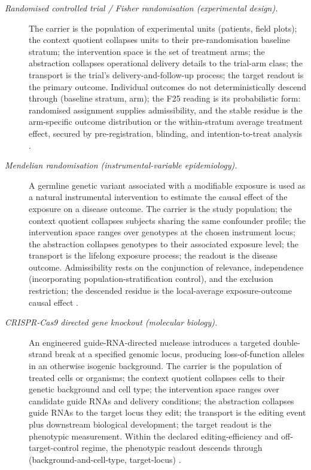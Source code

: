 \documentclass[11pt]{article}
\theoremstyle{definition}
\begin{document}
\begin{description}
\item[\emph{Randomised controlled trial / Fisher
randomisation (experimental design).}]
The carrier is the population of experimental units
(patients, field plots); the context quotient collapses
units to their pre-randomisation baseline stratum; the
intervention space is the set of treatment arms; the
abstraction collapses operational delivery details to
the trial-arm class; the transport is the trial's
delivery-and-follow-up process; the target readout is
the primary outcome.  Individual outcomes do not
deterministically descend through (baseline stratum,
arm); the F25 reading is its probabilistic form:
randomised assignment supplies admissibility, and the
stable residue is the arm-specific outcome distribution
or the within-stratum average treatment effect, secured
by pre-registration, blinding, and intention-to-treat
analysis \citep{Fisher1935DesignExperiments}.

\item[\emph{Mendelian randomisation
(instrumental-variable epidemiology).}]
A germline genetic variant associated with a modifiable
exposure is used as a natural instrumental intervention
to estimate the causal effect of the exposure on a
disease outcome.  The carrier is the study population;
the context quotient collapses subjects sharing the
same confounder profile; the intervention space ranges
over genotypes at the chosen instrument locus; the
abstraction collapses genotypes to their associated
exposure level; the transport is the lifelong exposure
process; the readout is the disease outcome.
Admissibility rests on the conjunction of relevance,
independence (incorporating population-stratification
control), and the exclusion restriction; the descended
residue is the local-average exposure-outcome causal
effect \citep{DaveySmith2003Mendelian}.

\item[\emph{CRISPR-Cas9 directed gene knockout
(molecular biology).}]
An engineered guide-RNA-directed nuclease introduces a
targeted double-strand break at a specified genomic
locus, producing loss-of-function alleles in an
otherwise isogenic background.  The carrier is the
population of treated cells or organisms; the context
quotient collapses cells to their genetic background and
cell type; the intervention space ranges over candidate
guide RNAs and delivery conditions; the abstraction
collapses guide RNAs to the target locus they edit; the
transport is the editing event plus downstream
biological development; the target readout is the
phenotypic measurement.  Within the declared
editing-efficiency and off-target-control regime, the
phenotypic readout descends through
(background-and-cell-type, target-locus)
\citep{Jinek2012CRISPR}.


\end{description}
\end{document}
